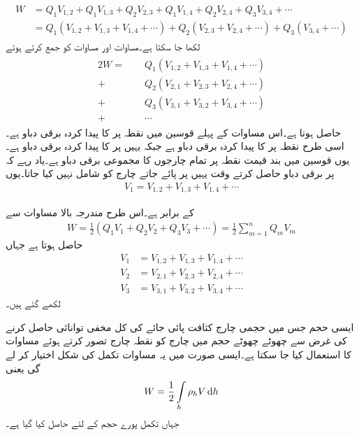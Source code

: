 \begin{gather}
\begin{aligned}\label{مساوات_توانائی_چارج_کثافت_توانائی_ب}
W&=Q_1 V_{1,2}+Q_1 V_{1,3} +Q_2 V_{2,3}+Q_1 V_{1,4} +Q_2 V_{2,4}+Q_3 V_{3,4}+\cdots\\
&=Q_1 (V_{1,2}+V_{1,3} + V_{1,4} +\cdots)+Q_2 (V_{2,3}+V_{2,4}+\cdots)+Q_3(V_{3,4}+\cdots)
\end{aligned}
\end{gather}
  لکھا جا سکتا ہے۔مساوات  اور مساوات  کو جمع کرتے ہوئے
\begin{gather}
\begin{aligned}
2 W=\phantom{+}&Q_1(V_{1,2}+V_{1,3} + V_{1,4} +\cdots)\\
+&Q_2 (V_{2,1}+V_{2,3}+V_{2,4}+\cdots)\\
+&Q_3( V_{3,1}+V_{3,2}+V_{3,4}+\cdots)\\
+&\cdots
\end{aligned}
\end{gather}
حاصل ہوتا ہے۔اس مساوات کے پہلے قوسین میں  نقطہ  پر  کا پیدا کردہ برقی دباو ہے۔اسی طرح  نقطہ  پر  کا پیدا کردہ برقی دباو ہے جبکہ  یہیں پر  کا پیدا کردہ برقی دباو ہے۔یوں قوسین میں بند قیمت نقطہ  پر تمام چارجوں کا مجموعی برقی دباو  ہے۔یاد رہے کہ  پر برقی دباو حاصل کرتے وقت یہیں پر پائے جاتے چارج  کو شامل نہیں کیا جاتا۔یوں
\begin{align*}
V_1=V_{1,2}+V_{1,3} + V_{1,4} +\cdots
\end{align*}

کے برابر ہے۔اس طرح مندرجہ بالا مساوات سے
\begin{align}\label{مساوات_توانائی_چارج_کثافت_توانائی_پ}
W=\frac{1}{2}\left(Q_1 V_1+Q_2 V_2+Q_3 V_3+\cdots\right)=\frac{1}{2}\sum_{m=1}^{n} Q_m V_m
\end{align}
حاصل ہوتا ہے جہاں 
\begin{align*}
V_1&=V_{1,2}+V_{1,3} + V_{1,4} +\cdots\\
V_2&=V_{2,1}+V_{2,3}+V_{2,4}+\cdots\\
V_3&=V_{3,1}+V_{3,2}+V_{3,4}+\cdots
\end{align*}
لکھے گئے ہیں۔

ایسی حجم جس میں حجمی چارج کثافت  پائی جائے کی کل مخفی توانائی حاصل کرنے کی غرض سے  چھوٹے چھوٹے حجم  میں چارج  کو نقطہ چارج تصور کرتے ہوئے مساوات  کا استعمال کیا جا سکتا ہے۔ایسی صورت میں یہ مساوات تکمل کی شکل اختیار کر لے گی یعنی
 \begin{align}\label{مساوات_توانائی_کثافت_تونائی}
W=\frac{1}{2}\int \limits_h \rho_h V \dif h
\end{align}
جہاں تکمل پورے حجم  کے لئے حاصل کیا گیا ہے۔


